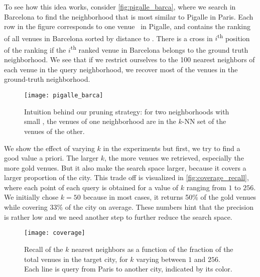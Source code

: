 To see how this idea works, consider \autoref{fig:pigalle_barca}, 
where we search in Barcelona to find the neighborhood that is most
similar to Pigalle in Paris. 
Each row in the figure corresponds to one venue \venue\ in Pigalle, 
and contains the ranking of all venues in Barcelona sorted by distance to
\venue. 
There is a cross
 in $i$\textsuperscript{th} position of the ranking if the
$i$\textsuperscript{th} ranked venue in Barcelona belongs to the ground truth
neighborhood.
We see that if we restrict ourselves to the 100 nearest neighbors of
each venue in the query neighborhood, 
we recover most of the venues in the ground-truth neighborhood.

\begin{figure}[b]
    \centering
    \texttt{[image: pigalle\_barca]}
    \caption{Intuition behind our pruning strategy: 
for two neighborhoods with small \emd, 
the venues of one neighborhood are in the $k$-NN set of the venues of
the other.  \label{fig:pigalle_barca}}
\end{figure}

We show the effect of varying $k$ in the experiments but first, we try to find
a good value a priori.  The larger $k$, the more venues we retrieved,
especially the more gold venues. But it also make the search space larger,
because it covers a larger proportion of the city. This trade off is visualized
in \autoref{fig:coverage_recall}, where each point of each query is obtained
for a value of $k$ ranging from $1$ to $256$. We initially chose $k=50$
because in most cases, it returns 50\% of the gold venues while covering 33\%
of the city on average. These numbers hint that the precision is rather low and
we need another step to further reduce the search space.

\medskip

\begin{figure}[tb]
    \centering
    \texttt{[image: coverage]}
	\caption{Recall of the $k$ nearest neighbors as a function of the fraction
	of the total venues in the target city, for $k$ varying between $1$ and
$256$. Each line is query from Paris to another city, indicated by its color.
\label{fig:coverage_recall}}
\end{figure}



